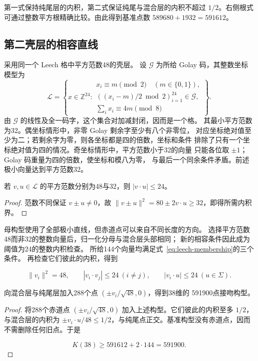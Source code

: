 第一式保持纯尾层的内积，第二式保证纯尾与混合层的内积不超过
\(1/2\)。右侧根式可通过整数平方根精确比较。由此得到基准点数
\(589680+1932=591612\)。

\subsection{第二壳层的相容直线}

采用同一个 Leech 格中平方范数48的壳层。
设 $\mathcal G$ 为所给 Golay 码，其整数坐标模型为
\begin{equation}
\mathcal L=\left\{x\in\mathbb Z^{24}:\begin{array}{l}
x_i\equiv m\pmod2\quad(m\in\{0,1\}),\\
((x_i-m)/2\bmod2)_{i=1}^{24}\in\mathcal G,\\
\sum_i x_i\equiv4m\pmod8
\end{array}\right\}.
\label{eq:leech-membership}
\end{equation}
由 $\mathcal G$ 的线性及全一码字，这个集合对加减封闭，因而是一个格。
其最小平方范数为32。偶坐标情形中，非零 Golay 剩余字至少有八个非零位，
对应坐标绝对值至少为二；若剩余字为零，则各坐标都是四的倍数，坐标和条件
排除了只有一个坐标绝对值为四的情况。奇坐标情形中，平方范数小于32的向量
只能各位取 $\pm1$；Golay 码重量为四的倍数，使坐标和模八为零，
与最后一个同余条件矛盾。前述极小向量达到平方范数32。

\begin{lemma}[第二壳层的相容性]
\label{lem:second-shell}
若 $v,u\in\mathcal L$ 的平方范数分别为48与32，则 $|v\cdot u|\le24$。
\end{lemma}
\begin{proof}
范数不同保证 $v\pm u\ne0$，故
$\|v\pm u\|^2=80\pm2v\cdot u\ge32$，即得所需内积界。
\end{proof}

母构型使用了全部极小直线，但赤道点可以来自不同长度的方向。
选择平方范数48而非32的整数向量后，归一化分母与混合层头部相同；
新的相容条件因此成为阈值为24的整数内积检查。
所给144个向量均满足式~\eqref{eq:leech-membership}的三个条件。
再检查它们彼此的内积，得到

\[
\|v_i\|^2=48,\qquad
|v_i\cdot v_j|\le24\ (i\ne j),\qquad
|v_i\cdot u|\le24\ (u\in\Sigma).
\]

\begin{proposition}[赤道补充]
\label{prop:equatorial}
向混合层与纯尾层加入288个点 $(\pm v_i/\sqrt{48},0)$，得到38维的
591900点接吻构型。
\end{proposition}
\begin{proof}
将288个赤道点 \((\pm v_i/\sqrt{48},0)\) 加入上述构型。它们彼此的内积至多
\(1/2\)，与混合层的内积为
\(\pm v_i\cdot u/48\le1/2\)，与纯尾点正交。基准构型没有赤道点，因而不需删除任何旧点。于是

\[
K(38)\ge591612+2\cdot144=591900.
\]
\end{proof}

